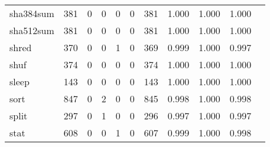 \begin{longtable}{lp{1.10cm}p{1.10cm}p{1.10cm}p{1.10cm}p{1.10cm}p{1.10cm}p{1.10cm}p{1.10cm}p{1.10cm}p{1.10cm}}
sha384sum &                    381 &                                  0 &                                 0 &                                0 &                                 0 &                             381 &                             1.000 &                                 1.000 &                               1.000 \\
sha512sum &                    381 &                                  0 &                                 0 &                                0 &                                 0 &                             381 &                             1.000 &                                 1.000 &                               1.000 \\
shred     &                    370 &                                  0 &                                 0 &                                1 &                                 0 &                             369 &                             0.999 &                                 1.000 &                               0.997 \\
shuf      &                    374 &                                  0 &                                 0 &                                0 &                                 0 &                             374 &                             1.000 &                                 1.000 &                               1.000 \\
sleep     &                    143 &                                  0 &                                 0 &                                0 &                                 0 &                             143 &                             1.000 &                                 1.000 &                               1.000 \\
sort      &                    847 &                                  0 &                                 2 &                                0 &                                 0 &                             845 &                             0.998 &                                 1.000 &                               0.998 \\
split     &                    297 &                                  0 &                                 1 &                                0 &                                 0 &                             296 &                             0.997 &                                 1.000 &                               0.997 \\
stat      &                    608 &                                  0 &                                 0 &                                1 &                                 0 &                             607 &                             0.999 &                                 1.000 &                               0.998 \\

\end{longtable}
